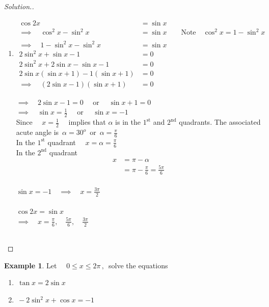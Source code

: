 \documentclass[11pt,a4paper]{article}
\theoremstyle{definition}
\newtheorem{example}[thm]{Example}
\newenvironment{solution}
  {\renewcommand{\qedsymbol}{}\begin{proof}[\textit{Solution}.]}
  {\end{proof}}
\begin{document}
\begin{solution}
\begin{enumerate}
\item[ii.]
\begin{align*}
\cos 2x & = \sin x\\
\implies \quad  \cos^2x - \sin^2x & = \sin x\qquad  \text{Note}\quad  \cos^2x = 1 - \sin^2x\\\\
\implies \quad  1 - \sin^2x - \sin^2x & = \sin x\\
2\sin^2x + \sin x - 1 & = 0\\
2\sin^2x + 2\sin x - \sin x  - 1 & = 0\\
2\sin x ( \sin x + 1) - 1(\sin x + 1) & = 0\\
\implies\quad  (2\sin x - 1)(\sin x + 1) & = 0
\end{align*}

$\implies\quad  2\sin x  - 1 = 0\quad $ or $\quad  \sin x + 1 = 0$\\

$\implies\quad  \sin x = \frac{1}{2}\quad $ or $\quad  \sin x  = -1$\\

Since $\quad  x = \frac{1}{2}\quad $ implies that $\alpha$ is in the $1^{\text{st}}$ and $2^{\text{nd}}$ quadrants. The associated acute angle is $\, \alpha = 30^o\,$ or $\, \alpha = \frac{\pi}{6}$\\

In the $1^{\text{st}}$ quadrant $\quad  x = \alpha = \frac{\pi}{6}$\\

In the $2^{\text{nd}}$ quadrant
\begin{align*}
x & = \pi - \alpha\\
& = \pi - \frac{\pi}{6} = \frac{5\pi}{6}\\
\end{align*}

$\sin x = -1 \quad \implies \quad  x = \frac{3\pi}{2}$\\\\

$\cos 2x = \sin x$\\

$\implies\quad  x = \frac{\pi}{6}, \quad  \frac{5\pi}{6},\quad  \frac{3\pi}{2}$\\\\
\end{enumerate}
\end{solution}
\begin{example}

Let $\quad  0\leq x \leq 2\pi\,,\,$ solve the equations
\begin{enumerate}
\item[i.] $\, \tan x = 2\sin x$
\item[ii.] $\, -2\sin^2x + \cos x = -1$\\
\end{enumerate}
\end{example}
\end{document}
